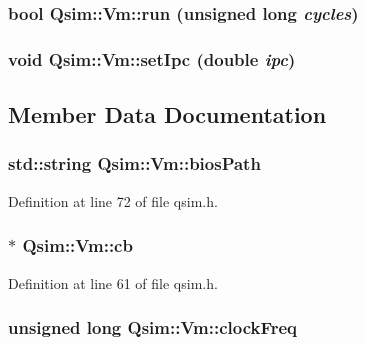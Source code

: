 \subsubsection[{run}]{\setlength{\rightskip}{0pt plus 5cm}bool Qsim::Vm::run (unsigned long {\em cycles})}\label{classQsim_1_1Vm_d5b25770dfd4b7a5396656078956a8ad}


\subsubsection[{setIpc}]{\setlength{\rightskip}{0pt plus 5cm}void Qsim::Vm::setIpc (double {\em ipc})}\label{classQsim_1_1Vm_46685766268bba71f3ab1a904646d39e}




\subsection{Member Data Documentation}
\subsubsection[{biosPath}]{\setlength{\rightskip}{0pt plus 5cm}std::string {\bf Qsim::Vm::biosPath}\hspace{0.3cm}{\tt  [private]}}\label{classQsim_1_1Vm_7b784b678b3f1192bbfc772ec196de19}




Definition at line 72 of file qsim.h.
\subsubsection[{cb}]{$\ast$ {\bf Qsim::Vm::cb}}\label{classQsim_1_1Vm_59512f15a5d5dd16d3aec033d05d8bc0}




Definition at line 61 of file qsim.h.
\subsubsection[{clockFreq}]{\setlength{\rightskip}{0pt plus 5cm}unsigned long {\bf Qsim::Vm::clockFreq}\hspace{0.3cm}{\tt  [private]}}\label{classQsim_1_1Vm_1fa5d458c114bb95b10b134b86cfff5a}




